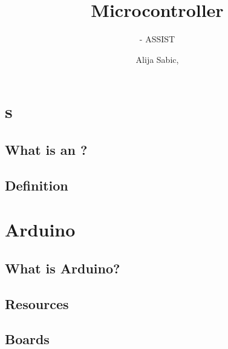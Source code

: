 \documentclass[aspectratio=169]{beamer}
\title[Microcontroller]{Microcontroller}
\subtitle{\glsentrytext{ci} - ASSIST \glsentrytext{heidi}}
\author{Alija Sabic, \glsentrytext{msc}}
\institute{Department Electronic Engineering}
\begin{document}
\begin{frame}[plain]
    \titlepage
\end{frame}

\section{}


% 

\section{s}

\subsection{What is an ?}


\subsection{Definition}


\subsection{}


\section{Arduino\textregistered{}}

\subsection{What is Arduino?}

\subsection{Resources}

\subsection{Boards}

\end{document}
